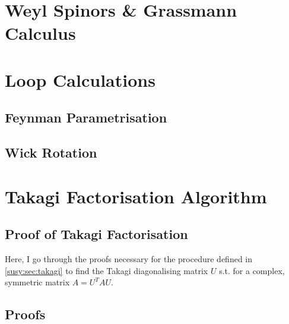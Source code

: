 \documentclass[../main.tex]{subfiles}
\begin{document}
\chapter{Weyl Spinors \& Grassmann Calculus}
\label{app:chap:weyl_grassmann}


\chapter{Loop Calculations}
\section{Feynman Parametrisation}
\label{app:sec:feynman_parametrisation}

\section{Wick Rotation}

\chapter{Takagi Factorisation Algorithm}
\label{app:chap:takagi}

\section{Proof of Takagi Factorisation}
Here, I go through the proofs necessary for the procedure defined in \cref{susy:sec:takagi} to find the Takagi diagonalising matrix \(U\) s.t. for a complex, symmetric matrix \(A = U^T A U\).

\section{Proofs}
\end{document}
